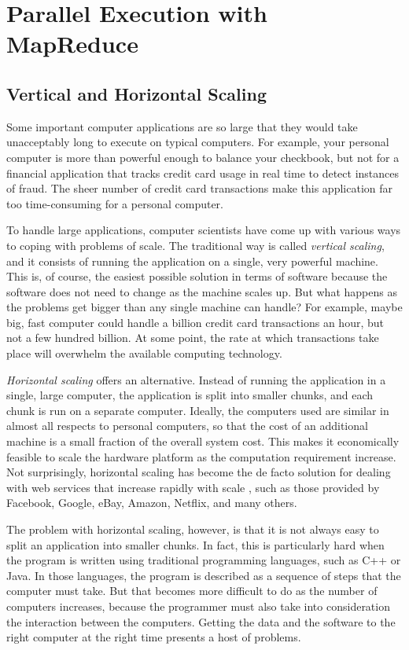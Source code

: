 \chapter{Parallel Execution with MapReduce}

\section{Vertical and Horizontal Scaling}

Some important computer applications are so large that they would take
unacceptably long to execute on typical computers.  For
example, your personal computer is more than powerful enough
to balance your checkbook, but not for a financial
application that tracks credit card usage in real time to
detect instances of fraud.  The sheer number of credit card
transactions make this application far too time-consuming for a
personal computer.

To handle large applications,
computer scientists have come up with various ways to coping
with problems of scale.  The traditional way is called
\emph{vertical scaling}, and it consists of running the
application on a single, very powerful machine.
This is, of course, the easiest possible solution in terms of software
because the software does not need to change as the machine scales up.
But what happens as the problems get bigger than any single machine can handle?
For example, maybe big, fast computer could handle
a billion credit card transactions an hour,
but not a few hundred billion.
At some point, the rate at which transactions take place
will overwhelm the available computing technology.

\emph{Horizontal scaling} offers an alternative.  Instead of
running the application in a single, large computer,
the application is split into smaller
chunks, and each chunk is run on a separate computer.
Ideally, the computers used are similar in almost all respects
to personal computers, so that the cost of an additional
machine is a small fraction of the overall system cost.
This makes it economically feasible to scale the
hardware platform as the computation requirement increase.
Not surprisingly, horizontal scaling has become the de facto
solution for dealing with web services that increase rapidly with scale ,
such as those provided by Facebook, Google, eBay, Amazon, Netflix, and many others.

The problem with horizontal scaling, however, is that it is
not always easy to split an application into smaller
chunks.  In fact, this is particularly hard when the program
is written using traditional programming languages, such as
C++ or Java.  In those languages, the program is described as
a sequence of steps that the computer must take.  But that
becomes more difficult to do as the number of computers
increases, because the programmer must also take into
consideration the interaction between the computers.
Getting the data and the software to the right computer
at the right time presents a host of problems.

